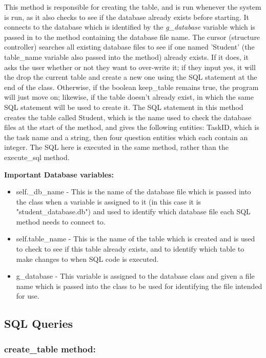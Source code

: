 This method is responsible for creating the table, and is run whenever the system is run, as it also checks to see if the database already exists before starting. It connects to the database which is identified by the \textit{g\_database} variable which is passed in to the method containing the database file name. The cursor (structure controller) searches all existing database files to see if one named 'Student' (the table\_name variable also passed into the method) already exists. If it does, it asks the user whether or not they want to over-write it; if they input yes, it will the drop the current table and create a new one using the SQL statement at the end of the class. Otherwise, if the boolean keep\_table remains true, the program will just move on; likewise, if the table doesn't already exist, in which the same SQL statement will be used to create it. The SQL statement in this method creates the table called Student, which is the name used to check the database files at the start of the method, and gives the following entities: TaskID, which is the task name and a string, then four question entities which each contain an integer. The SQL here is executed in the same method, rather than the execute\_sql method.

\textbf{Important Database variables: }

\begin{itemize}
	\item self.\_db\_name - This is the name of the database file which is passed into the class when a variable is assigned to it (in this case it is "student\_database.db") and used to identify which database file each SQL method needs to connect to.
	\item self.table\_name - This is the name of the table which is created and is used to check to see if this table already exists, and to identify which table to make changes to when SQL code is executed.
	\item g\_database - This variable is assigned to the database class and given a file name which is passed into the class to be used for identifying the file intended for use.
\end{itemize}

\subsection{SQL Queries}

\subsubsection{create\_table method: }


